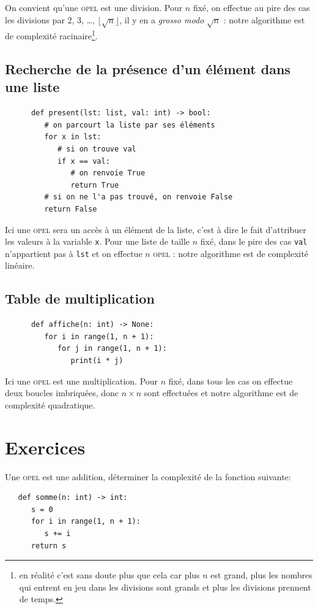 On convient qu'une \textsc{opel} est une division. Pour $n$ fixé, on effectue au pire des cas les divisions par 2, 3, \ldots, $\lfloor\sqrt{n}\rfloor$, il y en a \textit{grosso modo} $\sqrt{n}$ : notre algorithme est de complexité racinaire\footnote{en réalité c'est sans doute plus que cela car plus $n$ est grand, plus les nombres qui entrent en jeu dans les divisions sont grands et plus les divisions prennent de temps.}. 

\subsection{Recherche de la présence d'un élément dans une liste}

\begin{pyc}
   \begin{verbatim}
      def present(lst: list, val: int) -> bool:
         # on parcourt la liste par ses éléments
         for x in lst:
            # si on trouve val
            if x == val:
               # on renvoie True
               return True
         # si on ne l'a pas trouvé, on renvoie False
         return False
   \end{verbatim}
\end{pyc}
Ici une \textsc{opel} sera un accès à un élément de la liste, c'est à dire le fait d'attribuer les valeurs à la variable \texttt{x}. Pour une liste de taille $n$ fixé, dans le pire des cas \texttt{val} n'appartient pas à \texttt{lst} et on effectue $n$ \textsc{opel} : notre algorithme est de complexité linéaire.

\subsection{Table de multiplication} 

\begin{pyc}
   \begin{verbatim}
      def affiche(n: int) -> None:
         for i in range(1, n + 1):
            for j in range(1, n + 1):
               print(i * j)
   \end{verbatim}
\end{pyc}

Ici une \textsc{opel} est une multiplication. Pour $n$ fixé, dans tous les cas on effectue deux boucles imbriquées, donc $n\times n$ sont effectuées et notre algorithme est de complexité quadratique.

\section{Exercices}
\begin{exercice}
   Une \textsc{opel} est une addition, déterminer la complexité de la fonction suivante:
   \begin{verbatim}
   def somme(n: int) -> int:
      s = 0
      for i in range(1, n + 1):
         s += i
      return s
    \end{verbatim} 
\end{exercice}

